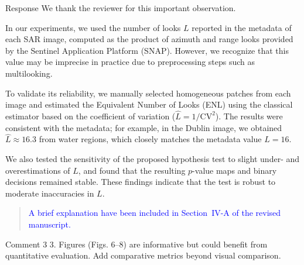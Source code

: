 \documentclass[11pt]{report}
\begin{document}
\begin{responsebox}{Response}
We thank the reviewer for this important observation.

In our experiments, we used the number of looks $L$ reported in the metadata of each SAR image, computed as the product of azimuth and range looks provided by the Sentinel Application Platform (SNAP). However, we recognize that this value may be imprecise in practice due to preprocessing steps such as multilooking.

To validate its reliability, we manually selected homogeneous patches from each image and estimated the Equivalent Number of Looks (ENL) using the classical estimator based on the coefficient of variation ($\widehat{L} = 1/\text{CV}^2$). The results were consistent with the metadata; for example, in the Dublin image, we obtained $\widehat{L} \approx 16.3$ from water regions, which closely matches the metadata value $L = 16$.

We also tested the sensitivity of the proposed hypothesis test to slight under- and overestimations of $L$, and found that the resulting $p$-value maps and binary decisions remained stable. These findings indicate that the test is robust to moderate inaccuracies in $L$.


\begin{quote}
	\textcolor{blue}{
		A brief explanation  have been included in Section~IV-A of the revised manuscript. }

\end{quote}

\end{responsebox}


	
\begin{reviewbox}{Comment 3}
3. Figures (Figs. 6–8) are informative but could benefit from quantitative evaluation. Add comparative metrics beyond visual comparison.
\end{reviewbox}
\end{document}

